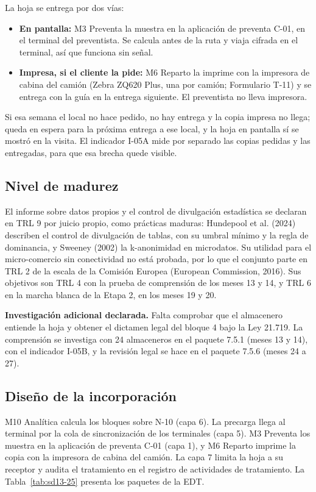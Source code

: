 La hoja se entrega por dos vías:

\begin{itemize}
  \item \textbf{En pantalla:} M3 Preventa la muestra en la aplicación de preventa C-01, en el terminal del preventista. Se calcula antes de la ruta y viaja cifrada en el terminal, así que funciona sin señal.
  \item \textbf{Impresa, si el cliente la pide:} M6 Reparto la imprime con la impresora de cabina del camión (Zebra ZQ620 Plus, una por camión; Formulario T-11) y se entrega con la guía en la entrega siguiente. El preventista no lleva impresora.
\end{itemize}

Si esa semana el local no hace pedido, no hay entrega y la copia impresa no llega; queda en espera para la próxima entrega a ese local, y la hoja en pantalla sí se mostró en la visita. El indicador I-05A mide por separado las copias pedidas y las entregadas, para que esa brecha quede visible.

\subsection{Nivel de madurez}

El informe sobre datos propios y el control de divulgación estadística se declaran en TRL 9 por juicio propio, como prácticas maduras: Hundepool et al. (2024) describen el control de divulgación de tablas, con su umbral mínimo y la regla de dominancia, y Sweeney (2002) la k-anonimidad en microdatos. Su utilidad para el micro-comercio sin conectividad no está probada, por lo que el conjunto parte en TRL 2 de la escala de la Comisión Europea (European Commission, 2016). Sus objetivos son TRL 4 con la prueba de comprensión de los meses 13 y 14, y TRL 6 en la marcha blanca de la Etapa 2, en los meses 19 y 20.

\textbf{Investigación adicional declarada.} Falta comprobar que el almacenero entiende la hoja y obtener el dictamen legal del bloque 4 bajo la Ley 21.719. La comprensión se investiga con 24 almaceneros en el paquete 7.5.1 (meses 13 y 14), con el indicador I-05B, y la revisión legal se hace en el paquete 7.5.6 (meses 24 a 27).

\subsection{Diseño de la incorporación}

M10 Analítica calcula los bloques sobre N-10 (capa 6). La precarga llega al terminal por la cola de sincronización de los terminales (capa 5). M3 Preventa los muestra en la aplicación de preventa C-01 (capa 1), y M6 Reparto imprime la copia con la impresora de cabina del camión. La capa 7 limita la hoja a su receptor y audita el tratamiento en el registro de actividades de tratamiento. La Tabla~\ref{tab:sd13-25} presenta los paquetes de la EDT.

